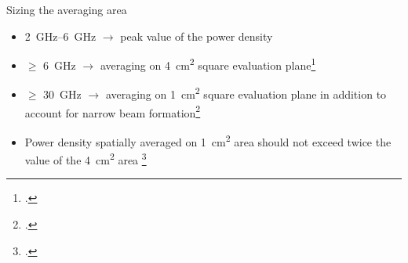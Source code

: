 \documentclass[xcolor=dvipsnames,10pt]{beamer}
\begin{document}
\begin{frame}{Sizing the averaging area}
    \begin{itemize}
        \item \SIrange{2}{6}{\GHz} $\rightarrow$ peak value of the power density
        \item $\geq$ \SI{6}{\GHz} $\rightarrow$ averaging on \SI{4}{\cm\squared} square evaluation plane\footcite{Hashimoto2017averaging,Funahashi2018Averaging}
        \item $\geq$ \SI{30}{\GHz} $\rightarrow$ averaging on \SI{1}{\cm\squared} square evaluation plane in addition to account for narrow beam formation\footcite{Foster2016Thermal}
        \item Power density spatially averaged on \SI{1}{\cm\squared} area should not exceed twice the value of the \SI{4}{\cm\squared} area \footcite{ICNIRP2020Guidelines}
    \end{itemize}
\end{frame}
\end{document}
